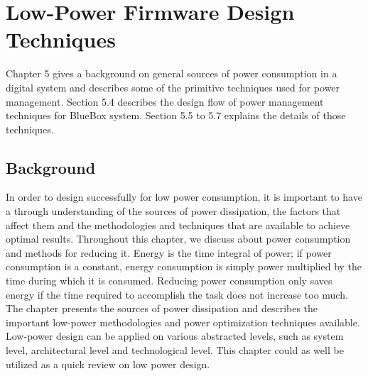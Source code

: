 \chapter{Low-Power Firmware Design Techniques}

Chapter 5 gives a background on general sources of power consumption in a digital system and describes some of the primitive techniques used for power management. Section 5.4 describes the design flow of power management techniques for BlueBox system. Section 5.5 to 5.7 explains the details of those techniques.  
\section{Background} In order to design successfully for low power consumption, it is important to have a through understanding of the sources of power dissipation, the factors that affect them and the methodologies and techniques that are available to achieve optimal results. 
Throughout this chapter, we discuss about power consumption and methods for reducing it. Energy is the time integral of power; if power consumption is a constant, energy consumption is simply power multiplied by the time during which it is consumed. Reducing power consumption only saves energy if the time required to accomplish the task does not increase too much. The chapter presents the sources of power dissipation and describes the important low-power methodologies and power optimization techniques available. Low-power design can be applied on various abstracted levels, such as system level, architectural level and technological level. This chapter could as well be utilized as a quick review on low power design. 

